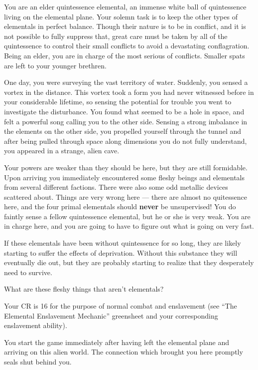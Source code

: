 \documentclass[char]{elementals}
\begin{document}
\name{\cElderQ{}}

You are an elder quintessence elemental, an immense white ball of quintessence living on the elemental plane.  Your solemn task is to keep the other types of elementals in perfect balance.  Though their nature is to be in conflict, and it is not possible to fully suppress that, great care must be taken by all of the quintessence to control their small conflicts to avoid a devastating conflagration. Being an elder, you are in charge of the most serious of conflicts. Smaller spats are left to your younger brethren.

One day, you were surveying the vast territory of water. Suddenly, you sensed a vortex in the distance. This vortex took a form you had never witnessed before in your considerable lifetime, so sensing the potential for trouble you went to investigate the disturbance. You found what seemed to be a hole in space, and felt a powerful song calling you to the other side. Sensing a strong imbalance in the elements on the other side, you propelled yourself through the tunnel and after being pulled through space along dimensions you do not fully understand, you appeared in a strange, alien cave.

Your powers are weaker than they should be here, but they are still formidable. Upon arriving you immediately encountered some fleshy beings and elementals from several different factions. There were also some odd metallic devices scattered about. Things are very wrong here --- there are almost no quitessence here, and the four primal elementals should \textbf{never} be unsupervised! You do faintly sense a fellow quintessence elemental, but he or she is very weak. You are in charge here, and you are going to have to figure out what is going on very fast.

If these elementals have been without quintessence for so long, they are likely starting to suffer the effects of \iWhiteQ{} deprivation. Without this substance they will eventually die out, but they are probably starting to realize that they desperately need \iWhiteQ{\MYname{}} to survive.

What are these fleshy things that aren't elementals?

Your CR is 16 for the purpose of normal combat and enslavement (see ``The Elemental Enslavement Mechanic'' greensheet and your corresponding enslavement ability).

You start the game immediately after having left the elemental plane and arriving on this alien world. The connection which brought you here promptly seals shut behind you.
\end{document}
